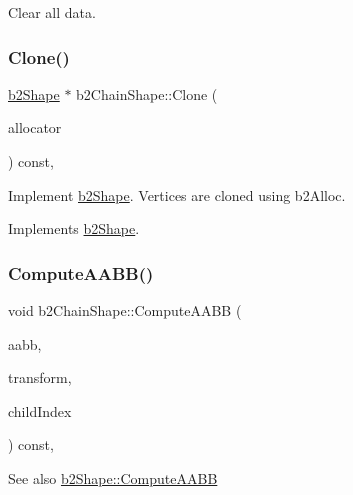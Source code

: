 Clear all data. 

\mbox{\label{classb2_chain_shape_a03d2ea80168d29c553fa21b5a821e6d8}} 
\subsubsection{\texorpdfstring{Clone()}{Clone()}}
{\footnotesize\ttfamily \mbox{\hyperlink{classb2_shape}{b2\+Shape}} $\ast$ b2\+Chain\+Shape\+::\+Clone (\begin{DoxyParamCaption}\item[{\mbox{\hyperlink{classb2_block_allocator}{b2\+Block\+Allocator}} $\ast$}]{allocator }\end{DoxyParamCaption}) const\hspace{0.3cm}{\ttfamily [override]}, {\ttfamily [virtual]}}



Implement \mbox{\hyperlink{classb2_shape}{b2\+Shape}}. Vertices are cloned using b2\+Alloc. 



Implements \mbox{\hyperlink{classb2_shape_a4716243454bb9cf7c7ee1d9cb23ae634}{b2\+Shape}}.

\mbox{\label{classb2_chain_shape_ae1d7470ce8d32e92d27c149ab45f5468}} 
\subsubsection{\texorpdfstring{ComputeAABB()}{ComputeAABB()}}
{\footnotesize\ttfamily void b2\+Chain\+Shape\+::\+Compute\+A\+A\+BB (\begin{DoxyParamCaption}\item[{\mbox{\hyperlink{structb2_a_a_b_b}{b2\+A\+A\+BB}} $\ast$}]{aabb,  }\item[{const \mbox{\hyperlink{structb2_transform}{b2\+Transform}} \&}]{transform,  }\item[{\mbox{\hyperlink{b2_settings_8h_a43d43196463bde49cb067f5c20ab8481}{int32}}}]{child\+Index }\end{DoxyParamCaption}) const\hspace{0.3cm}{\ttfamily [override]}, {\ttfamily [virtual]}}

\begin{DoxySeeAlso}{See also}
\mbox{\hyperlink{classb2_shape_a88e9807fab0c8ca9a98d8926e50a1411}{b2\+Shape\+::\+Compute\+A\+A\+BB}} 
\end{DoxySeeAlso}


